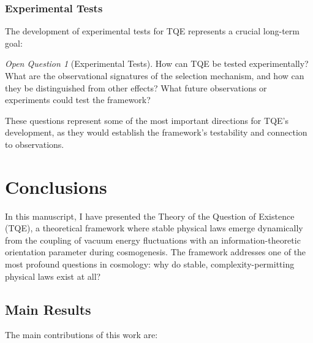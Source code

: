 \documentclass[12pt,a4paper]{article}
\theoremstyle{definition}
\theoremstyle{remark}
\newtheorem{question}{Open Question}[section]
\begin{document}
\subsubsection{Experimental Tests}

The development of experimental tests for TQE represents a crucial long-term goal:

\begin{question}[Experimental Tests]
How can TQE be tested experimentally? What are the observational signatures of the selection mechanism, and how can they be distinguished from other effects? What future observations or experiments could test the framework?
\end{question}

These questions represent some of the most important directions for TQE's development, as they would establish the framework's testability and connection to observations.

\section{Conclusions}

In this manuscript, I have presented the Theory of the Question of Existence (TQE), a theoretical framework where stable physical laws emerge dynamically from the coupling of vacuum energy fluctuations with an information-theoretic orientation parameter during cosmogenesis. The framework addresses one of the most profound questions in cosmology: why do stable, complexity-permitting physical laws exist at all?

\subsection{Main Results}

The main contributions of this work are:
\end{document}
